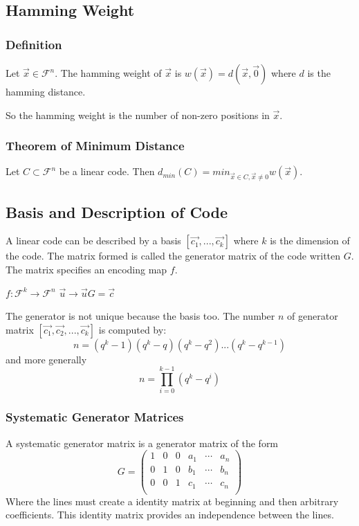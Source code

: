 \documentclass{article}
\begin{document}
\subsection{Hamming Weight}
\subsubsection{Definition}
Let $ \vec{x} \in \mathcal{F}^n $. The hamming weight of $ \vec{x} $ is $ w(\vec{x}) = d(\vec{x}, \vec{0}) $ where $ d $ is the hamming distance.
\begin{tcolorbox}[width=12.1cm, leftrule=3mm]
So the hamming weight is the number of non-zero positions in $ \vec{x} $.
\end{tcolorbox}

\subsubsection{Theorem of Minimum Distance}
Let $ C \subset \mathcal{F}^n $ be a linear code. Then $ d_{min}(C) = min_{\vec{x} \in C, \vec{x} \neq 0} w(\vec{x}) $.

\subsection{Basis and Description of Code}
A linear code can be described by a basis $ [\vec{c_1},...,\vec{c_k}] $ where $ k $ is the dimension of the code. The matrix formed is called the generator matrix of the code written $ G $. The matrix specifies an encoding map $ f $.
\begin{center}
$ f: \mathcal{F}^k \rightarrow \mathcal{F}^n $
$ \vec{u} \rightarrow \vec{u}G = \vec{c} $
\end{center}
The generator is not unique because the basis too. The number $ n $ of generator matrix $ [\vec{c_1},\vec{c_2},...,\vec{c_k}] $ is computed by:
\begin{equation}
n = (q^k - 1)(q^k - q)(q^k - q^2)...(q^k - q^{k-1})
\end{equation}
and more generally
\begin{equation}
n = \prod_{i=0}^{k-1} (q^k - q^i)
\end{equation}

\subsubsection{Systematic Generator Matrices}
A systematic generator matrix is a generator matrix of the form
\begin{equation*}
G = 
\begin{pmatrix}
1 & 0 & 0 & a_1 & \cdots & a_n \\
0 & 1 & 0 & b_1 & \cdots & b_n \\
0 & 0 & 1 & c_1 & \cdots & c_n \\
\end{pmatrix}
\end{equation*}
Where the lines must create a identity matrix at beginning and then arbitrary coefficients. This identity matrix provides an independence between the lines. 
\end{document}
